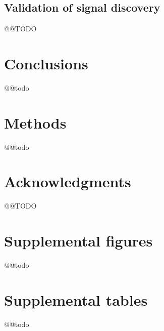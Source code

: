 \documentclass[a4paper,11pt,abstracton,hidelinks]{scrartcl}
\begin{document}
\subsection{Validation of signal discovery}\label{subsec:validation}


@@TODO


\section{Conclusions}\label{sec:conclusions}


@@todo


\section{Methods}\label{sec:methods}


@@todo


\section{Acknowledgments}\label{sec:acknowledgments}


@@TODO


\printbibliography


\clearpage
\beginsupplement
\section{Supplemental figures}\label{sec:supplemental-figures}


@@todo


\clearpage
\section{Supplemental tables}\label{sec:supplemental-tables}


@@todo
\end{document}
